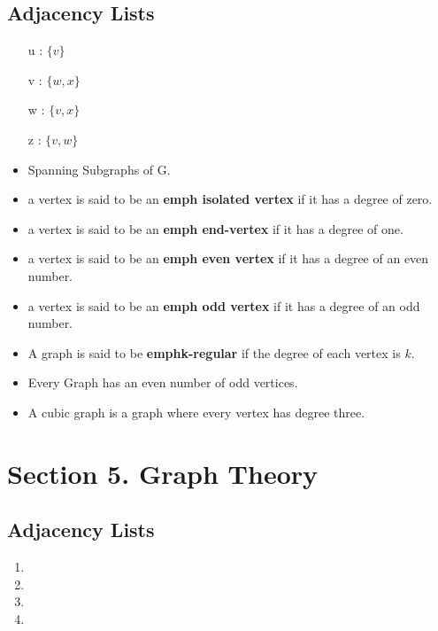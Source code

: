 \documentclass[]{report}
\begin{document}
\subsection*{Adjacency Lists}
\begin{itemize}
	\item[u]: $\{v\}$
	\item[v]: $\{w,x\}$
	\item[w]: $\{v,x\}$
	\item[z]: $\{v,w\}$
\end{itemize}




\begin{itemize}
	\item Spanning Subgraphs of G.
	
	\item a vertex is said to be an \textbf{emph{ isolated vertex}} if it has a degree of zero.
	\item a vertex is said to be an \textbf{emph{ end-vertex}} if it has a degree of one.
	\item a vertex is said to be an \textbf{emph{ even vertex}} if it has a degree of an even number.
	\item a vertex is said to be an \textbf{emph{ odd vertex}} if it has a degree of an odd number.
	
	
	\item A graph is said to be \textbf{emph{k-regular}} if the degree of each vertex is $k$. 
	\item Every Graph has an even number of odd vertices.
	\item A cubic graph is a graph where every vertex has degree three.
\end{itemize}
\section*{Section 5. Graph Theory}

\subsection*{Adjacency Lists}
\begin{enumerate}
	\item
	\item
	\item
	\item
\end{enumerate}
\end{document}
